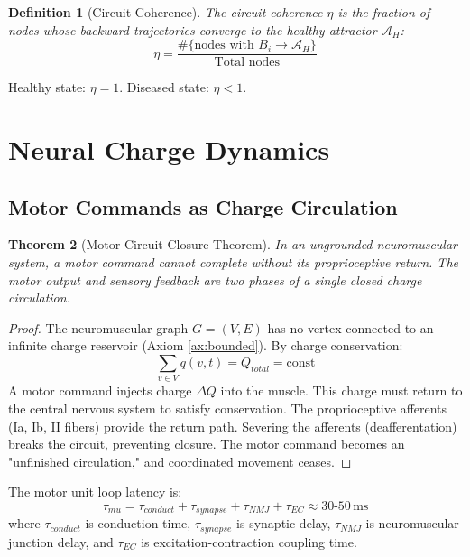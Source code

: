 \documentclass[12pt,a4paper]{article}
\newtheorem{theorem}{Theorem}[section]
\newtheorem{definition}[theorem]{Definition}
\begin{document}
\begin{definition}[Circuit Coherence]
The circuit coherence $\eta$ is the fraction of nodes whose backward trajectories converge to the healthy attractor $\mathcal{A}_H$:
\begin{equation}
\eta = \frac{\#\{\text{nodes with } B_i \to \mathcal{A}_H\}}{\text{Total nodes}}
\end{equation}
\end{definition}

Healthy state: $\eta = 1$. Diseased state: $\eta < 1$.

\section{Neural Charge Dynamics}

\subsection{Motor Commands as Charge Circulation}

\begin{theorem}[Motor Circuit Closure Theorem]
\label{thm:motorclosure}
In an ungrounded neuromuscular system, a motor command cannot complete without its proprioceptive return. The motor output and sensory feedback are two phases of a single closed charge circulation.
\end{theorem}

\begin{proof}
The neuromuscular graph $G = (V,E)$ has no vertex connected to an infinite charge reservoir (Axiom \ref{ax:bounded}). By charge conservation:
\begin{equation}
\sum_{v \in V} q(v,t) = Q_{total} = \text{const}
\end{equation}
A motor command injects charge $\Delta Q$ into the muscle. This charge must return to the central nervous system to satisfy conservation. The proprioceptive afferents (Ia, Ib, II fibers) provide the return path. Severing the afferents (deafferentation) breaks the circuit, preventing closure. The motor command becomes an "unfinished circulation," and coordinated movement ceases.
\end{proof}

The motor unit loop latency is:
\begin{equation}
\tau_{mu} = \tau_{conduct} + \tau_{synapse} + \tau_{NMJ} + \tau_{EC} \approx 30\text{-}50 \, \text{ms}
\end{equation}
where $\tau_{conduct}$ is conduction time, $\tau_{synapse}$ is synaptic delay, $\tau_{NMJ}$ is neuromuscular junction delay, and $\tau_{EC}$ is excitation-contraction coupling time.
\end{document}
